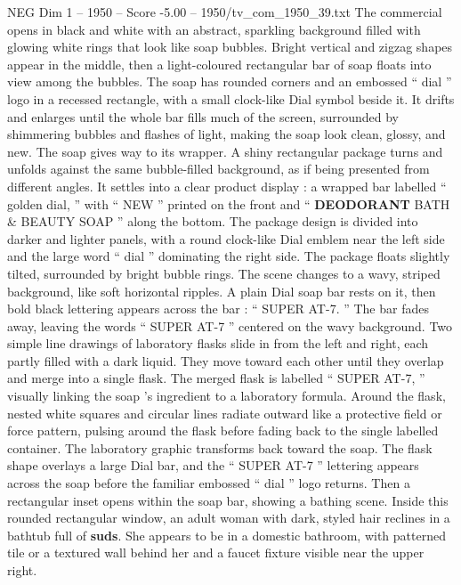 \begin{textsample}{NEG Dim 1 – 1950 – Score -5.00 – 1950/tv\_com\_1950\_39.txt}  \label{ex:f1_neg_004}
The commercial opens in black and white with an abstract, sparkling background filled with glowing white rings that look like soap bubbles.
Bright vertical and zigzag shapes appear in the middle, then a light-coloured rectangular bar of soap floats into view among the bubbles.
The soap has rounded corners and an embossed “ dial ” logo in a recessed rectangle, with a small clock-like Dial symbol beside it.
It drifts and enlarges until the whole bar fills much of the screen, surrounded by shimmering bubbles and flashes of light, making the soap look clean, glossy, and new.
The soap gives way to its wrapper.
A shiny rectangular package turns and unfolds against the same bubble-filled background, as if being presented from different angles.
It settles into a clear product display : a wrapped bar labelled “ golden dial, ” with “ NEW ” printed on the front and “ \textbf{DEODORANT} BATH \& BEAUTY SOAP ” along the bottom.
The package design is divided into darker and lighter panels, with a round clock-like Dial emblem near the left side and the large word “ dial ” dominating the right side.
The package floats slightly tilted, surrounded by bright bubble rings.
The scene changes to a wavy, striped background, like soft horizontal ripples.
A plain Dial soap bar rests on it, then bold black lettering appears across the bar : “ SUPER AT-7. ” The bar fades away, leaving the words “ SUPER AT-7 ” centered on the wavy background.
Two simple line drawings of laboratory flasks slide in from the left and right, each partly filled with a dark liquid.
They move toward each other until they overlap and merge into a single flask.
The merged flask is labelled “ SUPER AT-7, ” visually linking the soap ’s ingredient to a laboratory formula.
Around the flask, nested white squares and circular lines radiate outward like a protective field or force pattern, pulsing around the flask before fading back to the single labelled container.
The laboratory graphic transforms back toward the soap.
The flask shape overlays a large Dial bar, and the “ SUPER AT-7 ” lettering appears across the soap before the familiar embossed “ dial ” logo returns.
Then a rectangular inset opens within the soap bar, showing a bathing scene.
Inside this rounded rectangular window, an adult woman with dark, styled hair reclines in a bathtub full of \textbf{suds}.
She appears to be in a domestic bathroom, with patterned tile or a textured wall behind her and a faucet fixture visible near the upper right.

\end{textsample}
